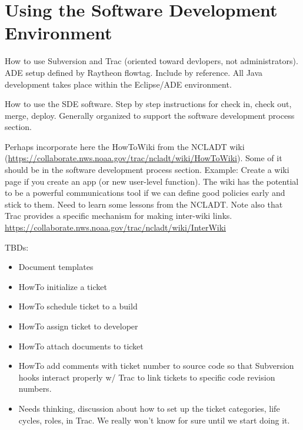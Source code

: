 
\section{Using the Software Development Environment}

How to use Subversion and Trac (oriented toward devlopers,
not administrators).  ADE setup defined by Raytheon flowtag.  
Include by reference.  All Java development takes place within the 
Eclipse/ADE environment.

How to use the SDE software.  Step by step instructions for check 
in, check out, merge, deploy.  Generally organized to support the 
software development process section.

Perhaps incorporate here the HowToWiki from the NCLADT wiki 
(\url{https://collaborate.nws.noaa.gov/trac/ncladt/wiki/HowToWiki}).  
Some of it should be in the software development process 
section.  Example: Create a wiki 
page if you create an app (or new user-level function).  The wiki
has the potential to be a powerful communications tool if we 
can define good policies early and stick to them.  Need to 
learn some lessons from the NCLADT.  Note also that Trac provides a specific
mechanism for making inter-wiki links.  
\url{https://collaborate.nws.noaa.gov/trac/ncladt/wiki/InterWiki}

TBDs:
\begin{itemize}
\item
Document templates
\item
HowTo initialize a ticket
\item
HowTo schedule ticket to a build
\item
HowTo assign ticket to developer
\item
HowTo attach documents to ticket
\item
HowTo add comments with ticket number to source code so that 
Subversion hooks interact properly w/ Trac to link tickets
to specific code revision numbers.
\item
Needs thinking, discussion about how to set up 
the ticket categories, life cycles, roles, in Trac.  We
really won't know for sure until we start doing it.
\end{itemize}













